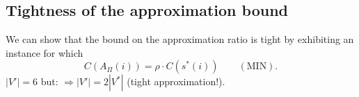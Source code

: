 \subsection{Tightness of the approximation bound}
We can show that the bound on the approximation ratio is tight by exhibiting an instance for which
\[C(A_\Pi(i))=\rho\cdot C(s^*(i))\qquad(\mathrm{MIN}).\]
$|V'|=6$ but:
$\Rightarrow|V'|=2|V^*|$ (tight approximation!).
